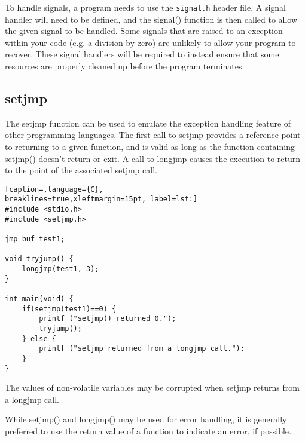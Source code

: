 To handle signals, a program needs to use the \texttt{signal.h} header file. A
signal handler will need to be defined, and the signal() function is then
called to allow the given signal to be handled. Some signals that are raised to
an exception within your code (e.g. a division by zero) are unlikely to allow
your program to recover. These signal handlers will be required to instead
ensure that some resources are properly cleaned up before the program
terminates.

\subsection{setjmp}
The setjmp function can be used to emulate the exception handling feature of
other programming languages. The first call to setjmp provides a reference
point to returning to a given function, and is valid as long as the function
containing setjmp() doesn't return or exit. A call to longjmp causes the
execution to return to the point of the associated setjmp call.
\lstset{basicstyle=\scriptsize, numbers=left, captionpos=b, tabsize=4}
\begin{lstlisting}[caption=,language={C},
breaklines=true,xleftmargin=15pt, label=lst:]
#include <stdio.h>
#include <setjmp.h>

jmp_buf test1;

void tryjump() {
	longjmp(test1, 3);
}

int main(void) {
	if(setjmp(test1)==0) {
		printf ("setjmp() returned 0.");
		tryjump();
	} else {
		printf ("setjmp returned from a longjmp call."):
	}
}
\end{lstlisting}

The values of non-volatile variables may be corrupted when setjmp returns from
a longjmp call. 

While setjmp() and longjmp() may be used for error handling, it is generally
preferred to use the return value of a function to indicate an error, if
possible. 
